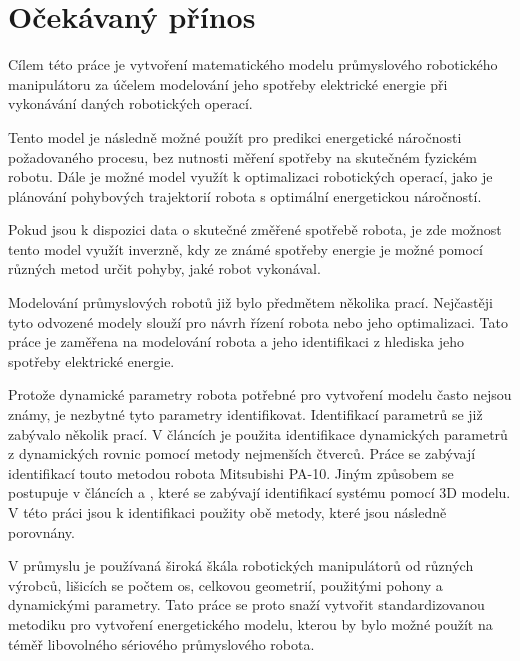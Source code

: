 \section{Očekávaný přínos}

Cílem této práce je vytvoření matematického modelu průmyslového robotického manipulátoru za účelem modelování jeho spotřeby elektrické energie při vykonávání daných robotických operací. 

Tento model je následně možné použít pro predikci energetické náročnosti požadovaného procesu, bez nutnosti měření spotřeby na skutečném fyzickém robotu. Dále je možné model využít k optimalizaci robotických operací, jako je plánování pohybových trajektorií robota s optimální energetickou náročností. 

Pokud jsou k dispozici data o skutečné změřené spotřebě robota, je zde možnost tento model využít inverzně, kdy ze známé spotřeby energie je možné pomocí různých metod určit pohyby, jaké robot vykonával.

Modelování průmyslových robotů již bylo předmětem několika prací. Nejčastěji tyto odvozené modely slouží pro návrh řízení robota nebo jeho optimalizaci. Tato práce je zaměřena na modelování robota a jeho identifikaci z hlediska jeho spotřeby elektrické energie. 

Protože dynamické parametry robota potřebné pro vytvoření modelu často nejsou známy, je nezbytné tyto parametry identifikovat. Identifikací parametrů se již zabývalo několik prací. V článcích \cite{par_iden_rob}\cite{clos_dyn_par} je použita identifikace dynamických parametrů z dynamických rovnic pomocí metody nejmenších čtverců. Práce \cite{dyn_mod_ind}\cite{dyn_ind_mits} se zabývají identifikací touto metodou robota Mitsubishi PA-10. Jiným způsobem se postupuje v článcích \cite{dyn_ind_man} a \cite{akeel}, které se zabývají identifikací systému pomocí 3D modelu. V této práci jsou k identifikaci použity obě metody, které jsou následně porovnány.

V průmyslu je používaná široká škála robotických manipulátorů od různých výrobců, lišicích se počtem os, celkovou geometrií, použitými pohony a dynamickými parametry. Tato práce se proto snaží vytvořit standardizovanou metodiku pro vytvoření energetického modelu, kterou by bylo možné použít na téměř libovolného sériového průmyslového robota.
